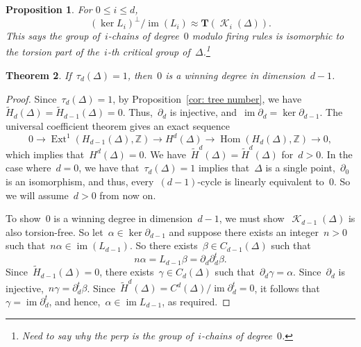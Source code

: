 \documentclass[12pt]{article}
\newcommand{\Z}{\mathbb{Z}}
\newcommand{\T}{\mathbf{T}}
\newcommand{\tH}{\widetilde{H}}
\DeclareMathOperator{\im}{\mathrm{im}}
\DeclareMathOperator{\Hom}{\mathrm{Hom}}
\DeclareMathOperator{\Ext}{\mathrm{Ext}}
\DeclareMathOperator{\crit}{\mathcal{K}}
\newtheorem{theorem}{Theorem}[section]
\newtheorem{prop}[theorem]{Proposition}
\theoremstyle{definition}
\theoremstyle{remark}
\begin{document}
\begin{prop}\label{prop: deg 0 iso} For $0\leq i\leq d$, 
\[
  (\ker L_i)^{\perp}/\im(L_i)\approx \T(\crit_i(\Delta)).
\]
This says the group of~$i$-chains of degree~$0$ modulo firing rules is
isomorphic to the torsion part of the~$i$-th critical group
of~$\Delta$.\footnote{Need to say why the perp is the group of~$i$-chains of
degree~$0$.}
\end{prop}

\begin{theorem} If~$\tau_d(\Delta)=1$, then~$0$ is a winning degree in
  dimension~$d-1$. 
\end{theorem}
\begin{proof} Since~$\tau_d(\Delta)=1$, by Proposition~\ref{cor: tree number},
  we have~$\tH_d(\Delta)=\tH_{d-1}(\Delta)=0$.  Thus,~$\partial_d$ is injective,
  and~$\im\partial_d=\ker\partial_{d-1}$.
  The universal coefficient theorem gives an exact sequence
  \[
    0\to\Ext^1(H_{d-1}(\Delta),\Z)\to H^d(\Delta)\to\Hom(H_d(\Delta),\Z)\to0,
  \]
  which implies that~$H^d(\Delta)=0$. We have~$\tH^d(\Delta)=\tH^d(\Delta)$
  for~$d>0$.  In the case where~$d=0$, we have that~$\tau_d(\Delta)=1$ implies
  that~$\Delta$ is a single point,~$\partial_{0}$ is an isomorphism, and thus,
  every~$(d-1)$-cycle is linearly equivalent to~$0$.  So we will assume~$d>0$
  from now on.

  To show~$0$ is a winning degree
  in dimension~$d-1$, we must show~$\crit_{d-1}(\Delta)$ is also torsion-free.
  So let~$\alpha\in\ker\partial_{d-1}$ and suppose there exists an
  integer~$n>0$ such that~$n\alpha\in\im(L_{d-1})$.  So there exists~$\beta\in
  C_{d-1}(\Delta)$ such that
  \[
    n\alpha=L_{d-1}\beta=\partial_d\partial_d^t\beta.
  \]
  Since~$\tH_{d-1}(\Delta)=0$,
  there exists~$\gamma\in C_d(\Delta)$ such that~$\partial_d\gamma=\alpha$.  
  Since~$\partial_d$ is injective,~$n\gamma=\partial_d^t\beta$.
  Since~$\tH^d(\Delta)=C^d(\Delta)/\im\partial_d^t=0$, it follows
  that~$\gamma=\im\partial_d^t$, and hence,~$\alpha\in\im L_{d-1}$, as required.
\end{proof}
\end{document}
